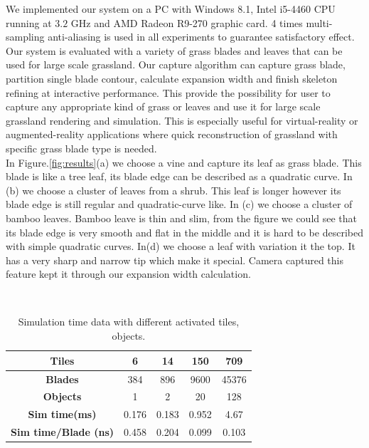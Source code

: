 \documentclass[10pt,journal,compsoc]{IEEEtran}
\begin{document}
We implemented our system on a PC with Windows 8.1, Intel i5-4460 CPU running at $3.2$ GHz and AMD Radeon R9-270 graphic card. 4 times multi-sampling anti-aliasing is used in all experiments to guarantee satisfactory effect.\\

Our system is evaluated with a variety of grass blades and leaves that can be used for large scale grassland. Our capture algorithm can capture grass blade, partition single blade contour, calculate expansion width and finish skeleton refining at interactive performance. This provide the possibility for user to capture any appropriate kind of grass or leaves and use it for large scale grassland rendering and simulation. This is especially useful for virtual-reality or augmented-reality applications where quick reconstruction of grassland with specific grass blade type is needed. \\



In Figure.\ref{fig:results}(a) we choose a vine and capture its leaf as grass blade. This blade is like a tree leaf, its blade edge can be described as a quadratic curve. In (b) we choose a cluster of leaves from a shrub. This leaf is longer however its blade edge is still regular and quadratic-curve like. In (c) we choose a cluster of bamboo leaves. Bamboo leave is thin and slim, from the figure we could see that its blade edge is very smooth and flat in the middle and it is hard to be described with simple quadratic curves. In(d) we choose a leaf with variation it the top. It has a very sharp and narrow tip which make it special. Camera captured this feature kept it through our expansion width calculation.

\\

\begin{table}[ht]
\begin{center}
 \begin{tabular}{|c|c|c|c|c|}
     \hline
     \textbf{Tiles} & 6 & 14 & 150 & 709 \\
     \hline
     \textbf{Blades}& 384 & 896 & 9600 & 45376 \\
     \hline
     \textbf{Objects} & 1 & 2 & 20 & 128 \\
     \hline
     \textbf{Sim time(ms)} & 0.176 & 0.183 & 0.952 & 4.67 \\
     \hline
     \textbf{Sim time/Blade (ns)} & 0.458 & 0.204 & 0.099 & 0.103 \\
     \hline
 \end{tabular}
 \caption{Simulation time data with different activated tiles, objects.}
 \label{table:frameprofile}
 \end{center}
 \end{table}
\end{document}
